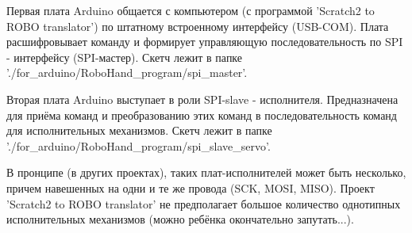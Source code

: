 Первая плата Arduino общается с компьютером (с программой 'Scratch2 to ROBO translator') по штатному встроенному интерфейсу (USB-COM). Плата расшифровывает команду и формирует управляющую последовательность по SPI - интерфейсу (SPI-мастер). Скетч лежит в папке './for\_arduino/RoboHand\_program/spi\_master'.

Вторая плата Arduino выступает в роли SPI-slave - исполнителя. Предназначена для приёма команд и преобразованию этих команд в последовательность команд для исполнительных механизмов. Скетч лежит в папке './for\_arduino/RoboHand\_program/spi\_slave\_servo'. 

В пронципе (в других проектах), таких плат-исполнителей может быть несколько, причем навешенных на одни и те же провода (SCK, MOSI, MISO). Проект 'Scratch2 to ROBO translator' не предполагает большое количество однотипных исполнительных механизмов (можно ребёнка окончательно запутать...).























